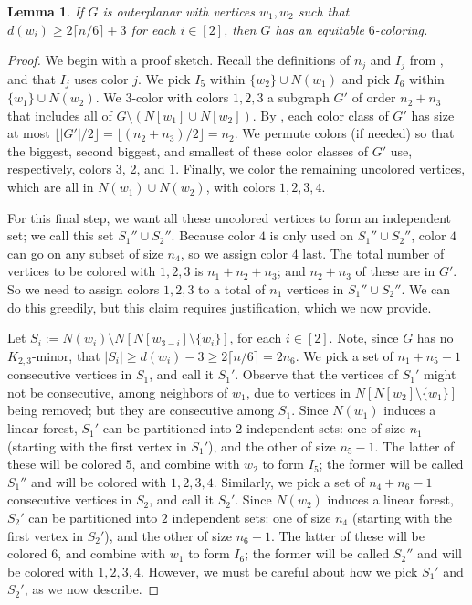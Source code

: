 \documentclass[11pt]{article}
\newtheorem{lem}{Lemma}
\theoremstyle{definition}
\newcommand\floor[1]{\lfloor#1\rfloor}
\newcommand\ceil[1]{\lceil#1\rceil}
\renewcommand\ge\geqslant
\begin{document}
\begin{lem}
	If $G$ is outerplanar with vertices $w_1,w_2$ such that $d(w_i)\ge 2\ceil{n/6}+3$ for each $i\in[2]$, then $G$ has an equitable $6$-coloring.
	\label{2-dangerous-lem}
\end{lem}
\begin{proof}
	We begin with a proof sketch.
	Recall the definitions of $n_j$ and $I_j$ from , and that $I_j$ uses color $j$.  We pick $I_5$ within $\{w_2\}\cup N(w_1)$ and 
	pick $I_6$ within
	$\{w_1\}\cup N(w_2)$.  We $3$-color with colors $1,2,3$ a subgraph $G'$ of order $n_2+n_3$ that includes all of $G\setminus(N[w_1]\cup N[w_2])$.
	By , each color class of $G'$ has size at most $\floor{|G'|/2} = \floor{(n_2+n_3)/2}=n_2$.  
	We permute colors (if needed) so that the biggest, second biggest, and smallest of these color classes of $G'$ use, respectively, 
	colors 3, 2, and 1.  Finally, we color the remaining uncolored vertices, which are all in $N(w_1)\cup N(w_2)$, with colors $1,2,3,4$.  

	For this final step, we want all these uncolored vertices to form an independent set; we call this set $S_1''\cup S_2''$.  
	Because color $4$ is only used on $S_1''\cup S_2''$, color $4$ can go on any subset of size $n_4$, so we assign color $4$ last.  
	The total number of vertices to be colored with $1,2,3$ is $n_1+n_2+n_3$;
	and $n_2+n_3$ of these are in $G'$.  So we need to assign colors $1,2,3$ to a total of $n_1$ vertices in $S_1''\cup S_2''$.  We can
	do this greedily, but this claim requires justification, which we now provide.
	\smallskip

	Let $S_i:=N(w_i)\setminus N[N[w_{3-i}]\setminus \{w_i\}]$, for each $i\in [2]$.  Note, since $G$ has no $K_{2,3}$-minor, that 
	$|S_i|\ge d(w_i)-3 \ge 2\ceil{n/6} = 2n_6$.  We pick a set of $n_1+n_5-1$ consecutive vertices in $S_1$, and call it $S_1'$.  
	Observe that the vertices of $S_1'$ might not be consecutive, among neighbors of $w_1$, due to vertices in $N[N[w_2]\setminus\{w_1\}]$ 
	being removed; but they are consecutive among $S_1$.
	Since $N(w_1)$ induces a linear forest, $S_1'$ can be partitioned into $2$ independent sets: one of size $n_1$ 
	(starting with the first vertex in $S_1'$), and the other of size $n_5-1$.  The latter of these will be colored $5$, and combine 
	with $w_2$ to form $I_5$; the former will be called $S_1''$ and will be colored with $1,2,3,4$.
	Similarly, we pick a set of $n_4+n_6-1$ consecutive vertices in $S_2$, and call it $S_2'$.
	Since $N(w_2)$ induces a linear forest, $S_2'$ can be partitioned into $2$ independent sets: one of size $n_4$ 
	(starting with the first vertex in $S_2'$), and the other of size $n_6-1$.  
	The latter of these will be colored $6$, and combine with $w_1$ to form $I_6$; the former will be called $S_2''$ and will be colored 
	with $1,2,3,4$.  However, we must be careful about how we pick $S_1'$ and $S_2'$, as we now describe. 


\end{proof}
\end{document}
